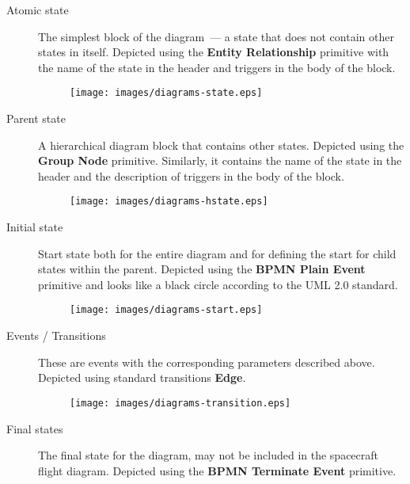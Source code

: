 \documentclass[12pt,a4paper]{article}
\begin{document}
\begin{description}
\item[Atomic state] The simplest block of the diagram~--- a state that does not contain
   other states in itself. Depicted using  the \textbf{Entity Relationship}
  primitive with the name of the state in the header and triggers in the body of the block.

\begin{figure}[h]
  \begin{center}
    \texttt{[image: images/diagrams-state.eps]}
  \end{center}
\end{figure}

\item[Parent state] A hierarchical diagram block that contains other states. Depicted using the \textbf{Group Node} primitive. Similarly, it contains the name of the state in the header and the description of triggers in the body of the block.

\begin{figure}[h]
  \begin{center}
    \texttt{[image: images/diagrams-hstate.eps]}
  \end{center}
\end{figure}

\item[Initial state] Start state both for the entire diagram and for defining the start for child states within the parent. Depicted using the \textbf{BPMN Plain Event} primitive and looks like a black circle according to the UML 2.0 standard.

\begin{figure}[h]
  \begin{center}
    \texttt{[image: images/diagrams-start.eps]}
  \end{center}
\end{figure}

\item[Events / Transitions] These are events with the corresponding parameters described above. Depicted using standard transitions \textbf{Edge}.

\begin{figure}[h]
  \begin{center}
    \texttt{[image: images/diagrams-transition.eps]}
  \end{center}
\end{figure}

\item[Final states] The final state for the diagram, may not be included in the spacecraft flight diagram. Depicted using the \textbf{BPMN
    Terminate Event} primitive.


\end{description}
\end{document}
